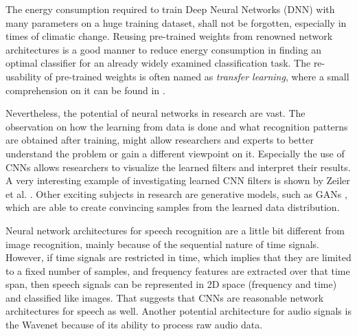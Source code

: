 The energy consumption required to train Deep Neural Networks (DNN) with many parameters on a huge training dataset, shall not be forgotten, especially in times of climatic change.
Reusing pre-trained weights from renowned network architectures is a good manner to reduce energy consumption in finding an optimal classifier for an already widely examined classification task.
The re-usability of pre-trained weights is often named as \emph{transfer learning}, where a small comprehension on it can be found in \cite{TransferLearning}.

Nevertheless, the potential of neural networks in research are vast.
The observation on how the learning from data is done and what recognition patterns are obtained after training, might allow researchers and experts to better understand the problem or gain a different viewpoint on it.
Especially the use of CNNs allows researchers to visualize the learned filters and interpret their results.
A very interesting example of investigating learned CNN filters is shown by Zeiler et al. \cite{Zeiler2013}.
Other exciting subjects in research are generative models, such as GANs \cite{Goodfellow2014}, which are able to create convincing samples from the learned data distribution.

Neural network architectures for speech recognition are a little bit different from image recognition, mainly because of the sequential nature of time signals.
However, if time signals are restricted in time, which implies that they are limited to a fixed number of samples, and frequency features are extracted over that time span, then speech signals can be represented in 2D space (frequency and time) and classified like images.
That suggests that CNNs are reasonable network architectures for speech as well.
Another potential architecture for audio signals is the Wavenet \cite{Oord2016} because of its ability to process raw audio data.